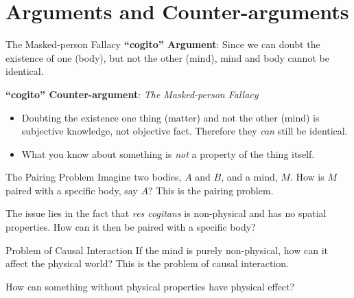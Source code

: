 \documentclass[aspectratio=1610]{beamer}
\begin{document}

\section{Arguments and Counter-arguments}


\begin{frame}{The Masked-person Fallacy}
	\textbf{``cogito'' Argument}: Since we can doubt the existence of one (body), but not the other (mind), mind and body cannot be identical.

	\pause
	\vspace{2em}

	\textbf{``cogito'' Counter-argument}: \textit{The Masked-person Fallacy}
	\begin{itemize}
		\pause
		\item Doubting the existence one thing (matter) and not the other (mind) is subjective knowledge, not objective fact. Therefore they \textit{can} still be identical.
		\pause
		\item What you know about something is \textit{not} a property of the thing itself.
	\end{itemize}
\end{frame}


\begin{frame}{The Pairing Problem}
	Imagine two bodies, $A$ and $B$, and a mind, $M$. How is $M$ paired with a specific body, say $A$? This is the \alert{pairing problem}.

	\pause
	\vspace{2em}

	The issue lies in the fact that \textit{res cogitans} is non-physical and has no spatial properties. How can it then be paired with a specific body?
\end{frame}


\begin{frame}{Problem of Causal Interaction}
	If the mind is purely non-physical, how can it affect the physical world? This is the \alert{problem of causal interaction}.

	How can something without physical properties have physical effect?
\end{frame}
\end{document}
